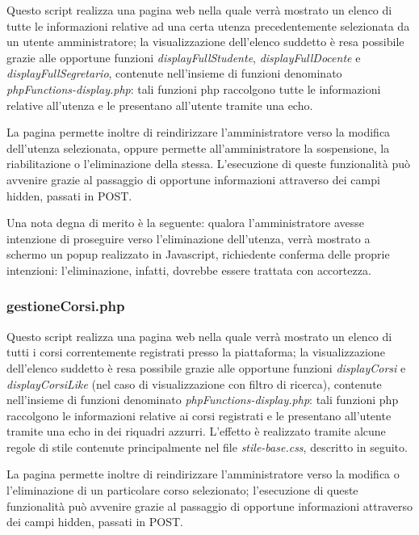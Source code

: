 \documentclass [a4paper,11pt]{book}
\begin{document}
Questo script realizza una pagina web nella quale verrà mostrato un elenco di tutte le informazioni relative ad una certa utenza precedentemente selezionata da un utente amministratore; la visualizzazione dell'elenco suddetto è resa possibile grazie alle opportune funzioni \emph{displayFullStudente}, \emph{displayFullDocente} e \emph{displayFullSegretario}, contenute nell'insieme di funzioni denominato \emph{phpFunctions-display.php}: tali funzioni php raccolgono tutte le informazioni relative all'utenza e le presentano all'utente tramite una echo.

La pagina permette inoltre di reindirizzare l'amministratore verso la modifica dell'utenza selezionata, oppure permette all'amministratore la sospensione, la riabilitazione o l'eliminazione della stessa. L'esecuzione di queste funzionalità può avvenire grazie al passaggio di opportune informazioni attraverso dei campi hidden, passati in POST.

Una nota degna di merito è la seguente: qualora l'amministratore avesse intenzione di proseguire verso l'eliminazione dell'utenza, verrà mostrato a schermo un popup realizzato in Javascript, richiedente conferma delle proprie intenzioni: l'eliminazione, infatti, dovrebbe essere trattata con accortezza.

\medskip

\subsubsection{gestioneCorsi.php}

Questo script realizza una pagina web nella quale verrà mostrato un elenco di tutti i corsi correntemente registrati presso la piattaforma; la visualizzazione dell'elenco suddetto è resa possibile grazie alle opportune funzioni \emph{displayCorsi} e \emph{displayCorsiLike} (nel caso di visualizzazione con filtro di ricerca), contenute nell'insieme di funzioni denominato \emph{phpFunctions-display.php}: tali funzioni php raccolgono le informazioni relative ai corsi registrati e le presentano all'utente tramite una echo in dei riquadri azzurri. L'effetto è realizzato tramite alcune regole di stile contenute principalmente nel file \emph{stile-base.css}, descritto in seguito.

La pagina permette inoltre di reindirizzare l'amministratore verso la modifica o l'eliminazione di un particolare corso selezionato; l'esecuzione di queste funzionalità può avvenire grazie al passaggio di opportune informazioni attraverso dei campi hidden, passati in POST.
\end{document}
